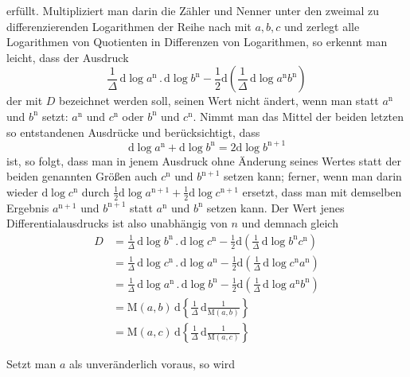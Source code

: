 erfüllt. Multipliziert man darin die Zähler und Nenner unter den zweimal zu differenzierenden Logarithmen der Reihe nach mit $a,b,c$ und zerlegt alle Logarithmen von Quotienten in Differenzen von Logarithmen, so erkennt man leicht, dass der Ausdruck
\[
\frac{1}{\Delta}\,\mathrm d\log a^{\mathrm n}\mathbin{.}\mathrm d\log b^{\mathrm n}
-\frac12\mathrm d\left(\frac{1}{\Delta}\,\mathrm d\log a^{\mathrm n}b^{\mathrm n}\right)
\]
der mit $D$ bezeichnet werden soll, seinen Wert nicht ändert, wenn man statt
$a^{\mathrm n}$ und $b^{\mathrm n}$ setzt: $a^{\mathrm n}$ und $c^{\mathrm n}$ oder
$b^{\mathrm n}$ und $c^{\mathrm n}$. Nimmt man das Mittel der beiden letzten so entstandenen Ausdrücke und berücksichtigt, dass
\[
\mathrm d\log a^{\mathrm n}+\mathrm d\log b^{\mathrm n}
=2\mathrm d\log b^{\mathrm n+1}
\]
ist, so folgt, dass man in jenem Ausdruck ohne Änderung seines Wertes statt der beiden genannten Größen auch $c^{\mathrm n}$ und $b^{\mathrm n+1}$ setzen kann; ferner, wenn man darin wieder $\mathrm d\log c^{\mathrm n}$ durch
$\frac12\mathrm d\log a^{\mathrm n+1}+\frac12\mathrm d\log c^{\mathrm n+1}$ ersetzt,
dass man mit demselben Ergebnis $a^{\mathrm n+1}$ und $b^{\mathrm n+1}$ statt
$a^{\mathrm n}$ und $b^{\mathrm n}$ setzen kann. 
Der Wert jenes Differentialausdrucks ist also unabhängig von $n$ und demnach gleich
\[
\begin{aligned}
D&=\displaystyle\frac{1}{\Delta}\,\mathrm d\log b^{\mathrm n}\mathbin{.}\mathrm d\log c^{\mathrm n}
-\frac12\mathrm d\left(\frac{1}{\Delta}\,\mathrm d\log b^{\mathrm n}c^{\mathrm n}\right)\\[6pt]
&=\displaystyle\frac{1}{\Delta}\,\mathrm d\log c^{\mathrm n}\mathbin{.}\mathrm d\log a^{\mathrm n}
-\frac12\mathrm d\left(\frac{1}{\Delta}\,\mathrm d\log c^{\mathrm n}a^{\mathrm n}\right)\\[6pt]
&=\displaystyle\frac{1}{\Delta}\,\mathrm d\log a^{\mathrm n}\mathbin{.}\mathrm d\log b^{\mathrm n}
-\frac12\mathrm d\left(\frac{1}{\Delta}\,\mathrm d\log a^{\mathrm n}b^{\mathrm n}\right)\\[6pt]
&=\displaystyle\mathrm M(a,b)\,\mathrm d\left\{\frac{1}{\Delta}\,\mathrm d\frac{1}{\mathrm M(a,b)}\right\}\\&=\mathrm M(a,c)\,\mathrm d\left\{\frac{1}{\Delta}\,\mathrm d\frac{1}{\mathrm M(a,c)}\right\}
\end{aligned}
\]
\par Setzt man $a$ als unveränderlich voraus, so wird

